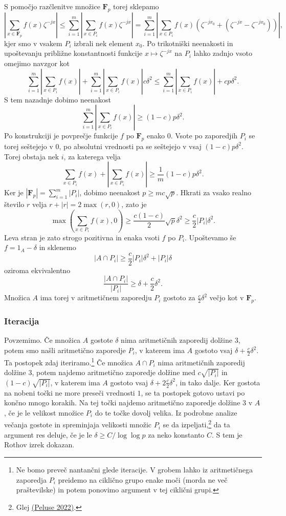 \documentclass[11pt]{book}
\def\FF{\mathbf{F}}
\theoremstyle{definition}
\theoremstyle{zgled}
\theoremstyle{odprtproblem}
\theoremstyle{domacanaloga}
\theoremstyle{izrek}
\begin{document}
S pomočjo razčlenitve množice $\FF_p$ torej sklepamo
\[
   \left|\sum_{x \in \FF_p} f(x) \zeta^{-jx}\right| \leq
   \sum_{i = 1}^m \left| \sum_{x \in P_i} f(x) \zeta^{-jx} \right|
   = \sum_{i = 1}^m \left| \sum_{x \in P_i} f(x) \left( \zeta^{-jx_0} + (\zeta^{-jx} - \zeta^{-jx_0}) \right) \right|,
\]
kjer smo v vsakem $P_i$ izbrali nek element $x_0$. Po trikotniški neenakosti in upoštevanju približne konstantnosti funkcije $x \mapsto \zeta^{-jx}$ na $P_i$ lahko zadnjo vsoto omejimo navzgor kot
\[
    \sum_{i = 1}^m \left| \sum_{x \in P_i} f(x) \right| + 
    \sum_{i = 1}^m \left| \sum_{x \in P_i} f(x) \right| c \delta^2
    \leq \sum_{i = 1}^m \left| \sum_{x \in P_i} f(x) \right| + c p \delta^2.
\]
S tem nazadnje dobimo neenakost
\[
\sum_{i = 1}^m \left| \sum_{x \in P_i} f(x) \right| \geq (1-c) p \delta^2.
\]
Po konstrukciji je povprečje funkcije $f$ po $\FF_p$ enako $0$. Vsote po zaporedjih $P_i$ se torej seštejejo v $0$, po absolutni vrednosti pa se seštejejo v vsaj $(1-c) p \delta^2$. Torej obstaja nek $i$, za katerega velja
\[
    \sum_{x \in P_i} f(x)
    +
    \left| \sum_{x \in P_i} f(x) \right|
     \geq \frac{1}{m} (1-c) p \delta^2.  
\]
Ker je $|\FF_p| = \sum_{i = 1}^m |P_i|$, dobimo neenakost $p \geq m c \sqrt{p}$. Hkrati za vsako realno število $r$ velja $r + |r| = 2 \max(r, 0)$, zato je
\[
    \max \left( \sum_{x \in P_i} f(x), 0 \right) \geq
    \frac{c (1-c)}{2}  \sqrt{p} \delta^2
    \geq \frac{c}{2} |P_i| \delta^2.  
\]
Leva stran je zato strogo pozitivna in enaka vsoti $f$ po $P_i$. Upoštevamo še $f = 1_A - \delta$ in sklenemo
\[
    |A \cap P_i| \geq \frac{c}{2} |P_i| \delta^2 + |P_i| \delta
\]
oziroma ekvivalentno
\[
    \frac{|A \cap P_i|}{|P_i|} \geq \delta + \frac{c}{2} \delta^2.
\]
Množica $A$ ima torej v aritmetičnem zaporedju $P_i$ gostoto za $\frac{c}{2} \delta^2$ večjo kot v $\FF_p$.

\subsubsection{Iteracija}

Povzemimo. Če množica $A$ gostote $\delta$ nima aritmetičnih zaporedij dolžine $3$, potem smo našli aritmetično zaporedje $P_i$, v katerem ima $A$ gostoto vsaj $\delta + \frac{c}{2} \delta^2$. Ta postopek zdaj iteriramo.\footnote{Ne bomo preveč nantančni glede iteracije. V grobem lahko iz aritmetičnega zaporedja $P_i$ preidemo na ciklično grupo enake moči (morda ne več praštevilske) in potem ponovimo argument v tej ciklični grupi.} Če množica $A \cap P_i$ nima aritmetičnih zaporedij dolžine $3$, potem najdemo aritmetično zaporedje dolžine med $c\sqrt{|P_i|}$ in $(1-c)\sqrt{|P_i|}$, v katerem ima $A$ gostoto vsaj $\delta + 2 \frac{c}{2} \delta^2$, in tako dalje. Ker gostota na nobeni točki ne more preseči vrednosti $1$, se ta postopek gotovo ustavi po končno mnogo korakih. Na tej točki najdemo aritmetično zaporedje dolžine $3$ v $A$, če je le velikost množice $P_i$ do te točke dovolj velika. Iz podrobne analize večanja gostote in spreminjaja velikosti množic $P_i$ se da izpeljati,\footnote{Glej \href{https://arxiv.org/pdf/2206.10037.pdf}{(Peluse 2022)}.} da ta argument res deluje, če je le $\delta \geq C/\log \log p$ za neko konstanto $C$. S tem je Rothov izrek dokazan.
\end{document}
